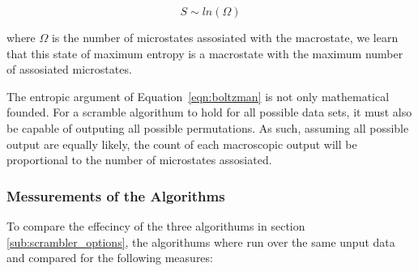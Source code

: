 		\begin{equation}
			S \sim ln(\Omega)
			\label{eqn:boltzman}
		\end{equation}

		where $\Omega$ is the number of microstates assosiated with the macrostate, we learn that this state of maximum entropy is a macrostate with the maximum number of assosiated microstates.
		\par
		The entropic argument of Equation~\ref{eqn:boltzman} is not only mathematical founded. 
		For a scramble algorithum to hold for all possible data sets, it must also be capable of outputing all possible permutations. 
		As such, assuming all possible output are equally likely, the count of each macroscopic output will be proportional to the number of microstates assosiated.

		\subsubsection{Messurements of the Algorithms} 
		\label{subsub:messurements_of_the_algorithms}

			To compare the effecincy of the three algorithums in section \ref{sub:scrambler_options}, the algorithums where run over the same unput data and compared for the following measures:

